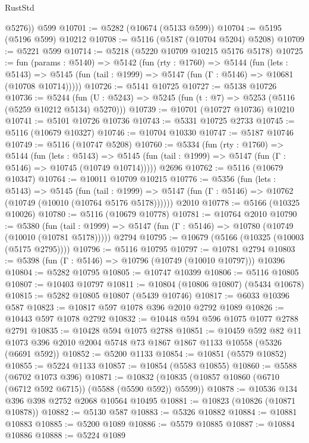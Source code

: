 \begin{lexlean}{RustStd}
\begin{coremodule}
{\begin{coremodule}
{{{{{{{{{{{{{{{{{{{{{{{{{{{{{{{        @5276))
    @599
@10701 := @5282 (@10674 (@5133 @599))
@10704 := @5195 (@5196 @599) @10212
@10708 := @5116 (@5187 (@10704 @5204) @5208)
@10709 := @5221 @599
@10714 := @5218 (@5220 @10709 @10215 @5176 @5178)
@10725 := fun (params : @5140) =>
  @5142
    (fun (rty : @1760) =>
    @5144
      (fun (lets : @5143) =>
      @5145 (fun (tail : @1999) => @5147 (fun (Γ : @5146) => @10681 (@10708 @10714)))))
@10726 := @5141 @10725
@10727 := @5138 @10726
@10736 := @5244
    (fun (U : @5243) => @5245 (fun (t : @7) => @5253 (@5116 (@5259 @10212 @5134) @5270)))
@10739 := @10701 (@10727 @10736) @10210
@10741 := @5101 @10726 @10736
@10743 := @5331 @10725 @2733
@10745 := @5116 (@10679 @10327)
@10746 := @10704 @10330
@10747 := @5187 @10746
@10749 := @5116 (@10747 @5208)
@10760 := @5334
    (fun (rty : @1760) =>
    @5144
      (fun (lets : @5143) =>
      @5145 (fun (tail : @1999) => @5147 (fun (Γ : @5146) => @10745 (@10749 @10714)))))
    @2696
@10762 := @5116 (@10679 @10347)
@10764 := @10011 @10709 @10215
@10776 := @5356
    (fun (lets : @5143) =>
    @5145
      (fun (tail : @1999) =>
      @5147 (fun (Γ : @5146) => @10762 (@10749 (@10010 (@10764 @5176 @5178))))))
    @2010
@10778 := @5166 (@10325 @10026)
@10780 := @5116 (@10679 @10778)
@10781 := @10764 @2010
@10790 := @5380
    (fun (tail : @1999) => @5147 (fun (Γ : @5146) => @10780 (@10749 (@10010 (@10781 @5178)))))
    @2794
@10795 := @10679 (@5166 (@10325 (@10003 (@5175 @2795))))
@10796 := @5116 @10795
@10797 := @10781 @2794
@10803 := @5398 (fun (Γ : @5146) => @10796 (@10749 (@10010 @10797))) @10396
@10804 := @5282 @10795
@10805 := @10747 @10399
@10806 := @5116 @10805
@10807 := @10403 @10797
@10811 := @10804 (@10806 @10807) (@5434 @10678)
@10815 := @5282 @10805 @10807 (@5439 @10746)
@10817 := @6033 @10396 @587
@10823 := @10817 @597 @1078 @396 @2010 @2792 @1089
@10826 := @10443 @597 @1078 @2792
@10832 := @10448 @594 @596 @1075 @1077 @2788 @2791
@10835 := @10428 @594 @1075 @2788
@10851 := @10459
    @592
    @82
    @11
    @1073
    @396
    @2010
    @2004
    @5748
    @73
    @1867
    @1867
    @1133
    @10558
    (@5326 (@6691 @592))
@10852 := @5200 @1133
@10854 := @10851 (@5579 @10852)
@10855 := @5224 @1133
@10857 := @10854 (@5583 @10855)
@10860 := @5588 (@6702 @1073 @396)
@10871 := @10832 (@10835 (@10857 @10860 (@6710 (@6712 @592 @6715)) (@5588 (@5590 @592)) @5599))
@10878 := @10536 @134 @396 @398 @2752 @2068 @10564 @10495
@10881 := @10823 (@10826 (@10871 @10878))
@10882 := @5130 @587
@10883 := @5326 @10882
@10884 := @10881 @10883
@10885 := @5200 @1089
@10886 := @5579 @10885
@10887 := @10884 @10886
@10888 := @5224 @1089
}}}}}}}}}}}}}}}}}}}}}}}}}}}}}}}
\end{coremodule}}
\end{coremodule}
\end{lexlean}
